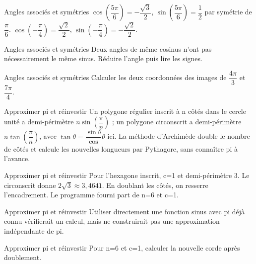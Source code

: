 \documentclass[aspectratio=169,10pt]{beamer}
\begin{document}
\begin{frame}{Angles associés et symétries}
\(\cos (\dfrac{5\pi}{6})=-\dfrac{\sqrt 3}{2}\), \(\sin (\dfrac{5\pi}{6})=\dfrac{1}{2}\) par symétrie de \(\dfrac{\pi}{6}\). \(\cos (-\dfrac{\pi}{4})=\dfrac{\sqrt 2}{2}\), \(\sin (-\dfrac{\pi}{4})=-\dfrac{\sqrt 2}{2}\).
\end{frame}
\begin{frame}{Angles associés et symétries}
Deux angles de même cosinus n’ont pas nécessairement le même sinus. Réduire l’angle puis lire les signes.
\end{frame}
\begin{frame}{Angles associés et symétries}
Calculer les deux coordonnées des images de \(\dfrac{4\pi}{3}\) et \(\dfrac{7\pi}{4}\).
\end{frame}
\begin{frame}{Approximer pi et réinvestir}
Un polygone régulier inscrit à n côtés dans le cercle unité a demi-périmètre \(n\sin (\dfrac{\pi}{n})\) ; un polygone circonscrit a demi-périmètre \(n\tan (\dfrac{\pi}{n})\), avec \(\tan \theta =\dfrac{\sin \theta}{\cos}\theta \) ici. La méthode d’Archimède double le nombre de côtés et calcule les nouvelles longueurs par Pythagore, sans connaître pi à l’avance.
\end{frame}
\begin{frame}{Approximer pi et réinvestir}
Pour l’hexagone inscrit, c=1 et demi-périmètre 3. Le circonscrit donne \(2\sqrt3\approx3{,}4641\). En doublant les côtés, on resserre l’encadrement. Le programme fourni part de n=6 et c=1.
\end{frame}
\begin{frame}{Approximer pi et réinvestir}
Utiliser directement une fonction sinus avec pi déjà connu vérifierait un calcul, mais ne construirait pas une approximation indépendante de pi.
\end{frame}
\begin{frame}{Approximer pi et réinvestir}
Pour n=6 et c=1, calculer la nouvelle corde après doublement.
\end{frame}
\end{document}
